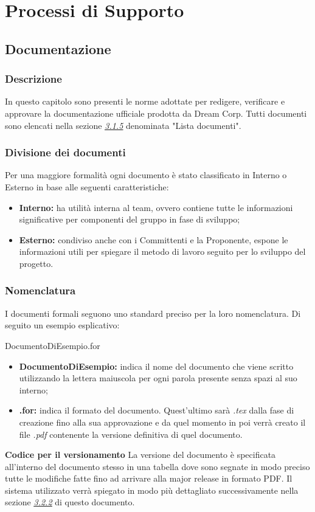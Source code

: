 \section{Processi di Supporto}

	\subsection{Documentazione}
		\subsubsection{Descrizione}
			In questo capitolo sono presenti le norme adottate per 	redigere, verificare e approvare la documentazione ufficiale prodotta da Dream Corp. Tutti documenti sono elencati nella sezione \hyperref[3.1.5]{\textit{\underline{3.1.5}}} denominata "Lista documenti".
		\subsubsection{Divisione dei documenti}
			Per una maggiore formalità ogni documento è stato classificato in Interno o Esterno in base alle seguenti caratteristiche:
			\begin{itemize}
				\item \textbf{Interno:} ha utilità interna al team, ovvero contiene tutte le informazioni significative per componenti del gruppo in fase di sviluppo;
				\item \textbf{Esterno:} condiviso anche con i Committenti e la Proponente, espone le informazioni utili per spiegare il metodo di lavoro seguito per lo sviluppo del progetto.
			\end{itemize}
		\subsubsection{Nomenclatura}
			I documenti formali seguono uno standard preciso per la loro nomenclatura. Di seguito un esempio esplicativo: 					\newline 
			\begin{center}
				DocumentoDiEsempio.for
			\end{center}
			\begin{itemize}
				\item \textbf{DocumentoDiEsempio:} indica il nome del documento che viene scritto utilizzando la lettera maiuscola per ogni parola presente senza spazi al suo interno;
				\item \textbf{.for:} indica il formato del documento. Quest'ultimo sarà \textit{.tex} dalla fase di creazione fino alla sua approvazione e da quel momento in poi verrà creato il file \textit{.pdf} contenente la versione definitiva di quel documento.
			\end{itemize}
			\textbf{Codice per il versionamento} La versione del documento è specificata all'interno del documento stesso in una tabella dove sono segnate in modo preciso tutte le modifiche fatte fino ad arrivare alla major release in formato PDF. Il sistema utilizzato verrà spiegato in modo più dettagliato successivamente nella sezione \hyperref[3.2.2]{\textit{\underline{3.2.2}}} di questo documento.
